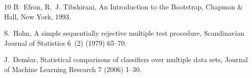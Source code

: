 \documentclass[final,5p,twocolumn]{elsarticle}
\begin{document}
\begin{thebibliography}{10}
B.~Efron, R.~J. Tibshirani, An Introduction to the Bootstrap, Chapman \& Hall,
  New York, 1993.

S.~Holm, A simple sequentially rejective multiple test procedure, Scandinavian
  Journal of Statistics 6~(2) (1979) 65--70.

J.~Dem{\v{s}}ar, Statistical comparisons of classifiers over multiple data
  sets, Journal of Machine Learning Research 7 (2006) 1--30.

\end{thebibliography}
\endgroup
\end{document}
